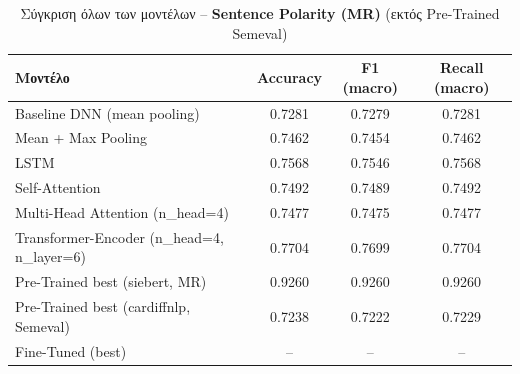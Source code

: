 \documentclass[11pt,a4paper]{article}
\begin{document}
\begin{table}[H]
  \centering
  \caption{Σύγκριση όλων των μοντέλων -- \textbf{\textlatin{Sentence Polarity (MR)}} (εκτός \textlatin{Pre-Trained Semeval})}
  \begin{tabular}{lccc}
    \toprule
    \textbf{Μοντέλο} & \textbf{\textlatin{Accuracy}} & \textbf{\textlatin{F1 (macro)}} & \textbf{\textlatin{Recall (macro)}} \\
    \midrule
    \textlatin{Baseline DNN (mean pooling)}              & 0.7281 & 0.7279 & 0.7281 \\
    \textlatin{Mean + Max Pooling}                       & 0.7462 & 0.7454 & 0.7462 \\
    \textlatin{LSTM}                                     & 0.7568 & 0.7546 & 0.7568 \\
    \textlatin{Self-Attention}                           & 0.7492 & 0.7489 & 0.7492 \\
    \textlatin{Multi-Head Attention (n\_head=4)}         & 0.7477 & 0.7475 & 0.7477 \\
    \textlatin{Transformer-Encoder (n\_head=4, n\_layer=6)} & 0.7704 & 0.7699 & 0.7704 \\
    \textlatin{Pre-Trained best (siebert, MR)}           & 0.9260 & 0.9260 & 0.9260 \\
    \textlatin{Pre-Trained best (cardiffnlp, Semeval)}   & 0.7238 & 0.7222 & 0.7229 \\
    \textlatin{Fine-Tuned (best)}                        & -- & -- & -- \\
    \bottomrule
  \end{tabular}
\end{table}
\end{document}
